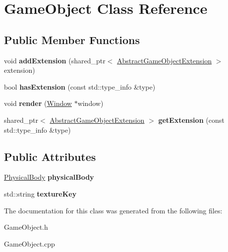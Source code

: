 \hypertarget{class_game_object}{}\section{Game\+Object Class Reference}
\label{class_game_object}
\subsection*{Public Member Functions}
\begin{DoxyCompactItemize}
\item 
\mbox{\label{class_game_object_a8facf0ff97735803de908096859da1f9}} 
void {\bfseries add\+Extension} (shared\+\_\+ptr$<$ \mbox{\hyperlink{class_abstract_game_object_extension}{Abstract\+Game\+Object\+Extension}} $>$ extension)
\item 
\mbox{\label{class_game_object_a611a94761cac7503507c88415d7085f3}} 
bool {\bfseries has\+Extension} (const std\+::type\+\_\+info \&type)
\item 
\mbox{\label{class_game_object_a3668ee9b3cd66d924564d883ac0e7417}} 
void {\bfseries render} (\mbox{\hyperlink{class_window}{Window}} $\ast$window)
\item 
\mbox{\label{class_game_object_a30f1fa65c3c058952b30ed8a08176d3c}} 
shared\+\_\+ptr$<$ \mbox{\hyperlink{class_abstract_game_object_extension}{Abstract\+Game\+Object\+Extension}} $>$ {\bfseries get\+Extension} (const std\+::type\+\_\+info \&type)
\end{DoxyCompactItemize}
\subsection*{Public Attributes}
\begin{DoxyCompactItemize}
\item 
\mbox{\label{class_game_object_a1171f2f6a12999c18dae12e027fbb7f3}} 
\mbox{\hyperlink{class_physical_body}{Physical\+Body}} {\bfseries physical\+Body}
\item 
\mbox{\label{class_game_object_a86e87d96565b844ba8e23ca107d6cf2f}} 
std\+::string {\bfseries texture\+Key}
\end{DoxyCompactItemize}


The documentation for this class was generated from the following files\+:\begin{DoxyCompactItemize}
\item 
Game\+Object.\+h\item 
Game\+Object.\+cpp\end{DoxyCompactItemize}
